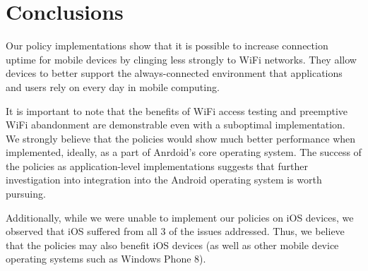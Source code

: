 \section{Conclusions}
\label{sec:conc}

Our policy implementations show that it is possible to increase connection uptime for mobile devices by clinging less strongly to WiFi networks. They allow devices to better support the always-connected environment that applications and users rely on every day in mobile computing.

It is important to note that the benefits of WiFi access testing and preemptive WiFi abandonment are demonstrable even with a suboptimal implementation. We strongly believe that the policies would show much better performance when implemented, ideally, as a part of Anrdoid's core operating system. The success of the policies as application-level implementations suggests that further investigation into integration into the Android operating system is worth pursuing.

Additionally, while we were unable to implement our policies on iOS devices, we observed that iOS suffered from all 3 of the issues addressed. Thus, we believe that the policies may also benefit iOS devices (as well as other mobile device operating systems such as Windows Phone 8).
